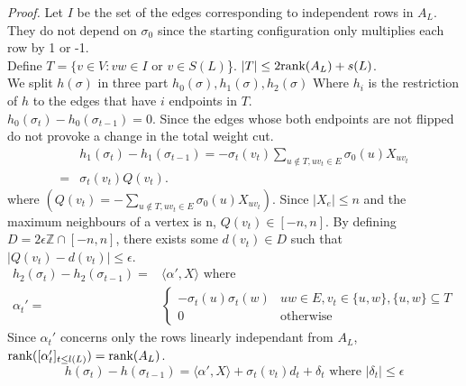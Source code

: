\textit{Proof.} Let $I$ be the set of the edges corresponding to independent rows in $A_L$. They do not depend on $\sigma_0$ since the starting configuration only multiplies each row by 1 or -1.\\
Define $T = \{v \in V: vw \in I \text{ or } v \in S(L)$\}. $|T| \leq 2 \text{rank}(A_L) + s(L)$. \\
We split $h(\sigma)$ in three part $h_0(\sigma), h_1(\sigma), h_2(\sigma)$ Where $h_i$ is the restriction of $h$ to the edges that have $i$ endpoints in $T$. \\
$h_0(\sigma_t) - h_0(\sigma_{t -1}) = 0$. Since the edges whose both endpoints are not flipped do not provoke a change in the total weight cut. \\
\begin{equation*}
\begin{split}
&h_1(\sigma_t) - h_1(\sigma_{t-1}) = -\sigma_t(v_t)\sum_{u \not\in T, uv_t \in E}\sigma_0(u)X_{uv_t} \\
=& \sigma_t(v_t)Q(v_t).
\end{split}
\end{equation*}
where $(Q(v_t) = -\sum_{u \not\in T, uv_t \in E}\sigma_0(u)X_{uv_t})$. Since $|X_e| \leq n$ and the maximum neighbours of a vertex is n, $Q(v_t) \in [-n, n]$. By defining $D = 2\epsilon\mathbb Z \cap [-n, n]$, there exists some $d(v_t) \in D$ such that $|Q(v_t) - d(v_t)| \leq \epsilon$.\\
\begin{equation*}
\begin{split}
h_2(\sigma_t) - h_2(\sigma_{t-1}) = &\langle\alpha ', X \rangle \text{ where }\\
\alpha_t ' =  &
\begin{cases}
-\sigma_t(u)\sigma_t(w) & uw \in E, v_t \in \{u, w\}, \{u, w\} \subseteq T \\
0 & \text{otherwise}
\end{cases}
\end{split}
\end{equation*}
Since $\alpha_t'$ concerns only the rows linearly independant from $A_L$, $\text{rank}([\alpha_t']_{t \leq l(L)}) = \text{rank}(A_L)$. \\
\begin{equation*}
h(\sigma_t) - h(\sigma_{t-1}) = \langle\alpha ', X \rangle +   \sigma_t(v_t)d_t + \delta_t \text{    where }|\delta_t| \leq \epsilon
\end{equation*}

